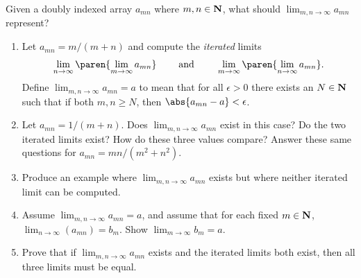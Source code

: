\documentclass{lew98_solutions}
\begin{document}
\begin{exercise}
\label{ex:2.3.13}
    Given a doubly indexed array \( a_{mn} \) where \( m, n \in \mathbf{N} \), what should \( \lim_{m, n \to \infty} a_{mn} \) represent?
    \begin{enumerate}
        \item Let \( a_{mn} = m/(m + n) \) and compute the \textit{iterated} limits
        \[
            \lim_{n \to \infty} \paren{ \lim_{m \to \infty} a_{mn} } \hspaceand[8mm] \lim_{m \to \infty} \paren{ \lim_{n \to \infty} a_{mn} }.
        \]
        Define \( \lim_{m, n \to \infty} a_{mn} = a \) to mean that for all \( \epsilon > 0 \) there exists an \( N \in \mathbf{N} \) such that if both \( m, n \geq N \), then \( \abs{a_{mn} - a} < \epsilon \).

        \item Let \( a_{mn} = 1/(m + n) \). Does \( \lim_{m, n \to \infty} a_{mn} \) exist in this case? Do the two iterated limits exist? How do these three values compare? Answer these same questions for \( a_{mn} = mn/(m^2 + n^2) \).

        \item Produce an example where \( \lim_{m, n \to \infty} a_{mn} \) exists but where neither iterated limit can be computed.

        \item Assume \( \lim_{m, n \to \infty} a_{mn} = a \), and assume that for each fixed \( m \in \mathbf{N} \), \( \lim_{n \to \infty} (a_{mn}) = b_m \). Show \( \lim_{m \to \infty} b_m = a \).

        \item Prove that if \( \lim_{m, n \to \infty} a_{mn} \) exists and the iterated limits both exist, then all three limits must be equal.
    \end{enumerate}
\end{exercise}
\end{document}
